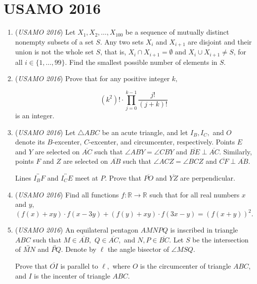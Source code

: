 \section{USAMO 2016}
        \begin{enumerate}
        	\item (\textit{USAMO 2016}) Let $X_1, X_2, \ldots, X_{100}$ be a sequence of mutually distinct nonempty subsets of a set $S$. Any two sets $X_i$ and $X_{i+1}$ are disjoint and their union is not the whole set $S$, that is, $X_i\cap X_{i+1}=\emptyset$ and $X_i\cup X_{i+1}\neq S$, for all $i\in\{1, \ldots, 99\}$. Find the smallest possible number of elements in $S$.


 

	\item (\textit{USAMO 2016}) Prove that for any positive integer $k,$

 \[\left(k^2\right)!\cdot\prod_{j=0}^{k-1}\frac{j!}{\left(j+k\right)!}\]
is an integer.


 

	\item (\textit{USAMO 2016}) Let $\triangle ABC$ be an acute triangle, and let $I_B, I_C,$ and $O$ denote its $B$-excenter, $C$-excenter, and circumcenter, respectively. Points $E$ and $Y$ are selected on $\overline{AC}$ such that $\angle ABY = \angle CBY$ and $\overline{BE}\perp\overline{AC}.$ Similarly, points $F$ and $Z$ are selected on $\overline{AB}$ such that $\angle ACZ = \angle BCZ$ and $\overline{CF}\perp\overline{AB}.$


 Lines $\overleftrightarrow{I_B F}$ and $\overleftrightarrow{I_C E}$ meet at $P.$ Prove that $\overline{PO}$ and $\overline{YZ}$ are perpendicular.


 

	\item (\textit{USAMO 2016}) Find all functions $f:\mathbb{R}\rightarrow \mathbb{R}$ such that for all real numbers $x$ and $y$, 
 \[(f(x)+xy)\cdot f(x-3y)+(f(y)+xy)\cdot f(3x-y)=(f(x+y))^2.\]


	\item (\textit{USAMO 2016}) An equilateral pentagon $AMNPQ$ is inscribed in triangle $ABC$ such that $M\in\overline{AB},$ $Q\in\overline{AC},$ and $N, P\in\overline{BC}.$ Let $S$ be the intersection of $\overleftrightarrow{MN}$ and $\overleftrightarrow{PQ}.$ Denote by $\ell$ the angle bisector of $\angle MSQ.$


 Prove that $\overline{OI}$ is parallel to $\ell,$ where $O$ is the circumcenter of triangle $ABC,$ and $I$ is the incenter of triangle $ABC.$



\end{enumerate}
